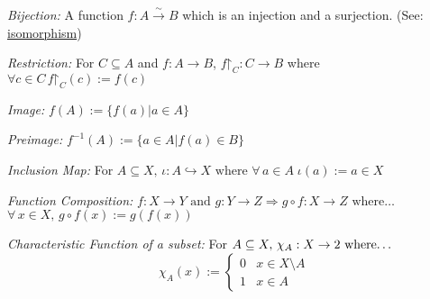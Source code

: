\noindent \emph{Bijection:} \label{bijection} A function $f: A \xrightarrow{\sim} B$ which is an injection and a surjection. (See: \hyperref[isomorphism]{isomorphism}) \newline

\noindent \emph{Restriction:} \label{restriction} For $C \subseteq A$ and $f:A \rightarrow B$, $\ensuremath{f\mathord{\upharpoonright}_C:C \rightarrow B}$ where \mbox{$\forall c \in C \, \ensuremath{f\mathord{\upharpoonright}_C(c)} := f(c)$} \newline

\noindent \emph{Image:} \label{image} $f(A) := \{f(a) | a \in A \}$ \newline

\noindent \emph{Preimage:} \label{preimage} $f^{-1}(A) := \{a \in A | f(a) \in B \}$ \newline

\noindent \emph{Inclusion Map:} \label{inclusionmap} For $A \subseteq X, \, \iota : A \hookrightarrow X \textrm{ where } \forall \, a \in A \; \iota(a) := a \in X$ \newline

\noindent \emph{Function Composition:} \label{functioncomposition} $f:X \rightarrow Y \textrm{ and } g:Y \rightarrow Z \Rightarrow g \circ f:X \rightarrow Z \textrm{ where} \dots$
$\forall \, x \in X, \, g \circ f(x) := g(f(x))$ \newline

\noindent \emph{Characteristic Function of a subset:} \label{characteristicfucntion} For $A \subseteq X, \, \chi_A : X \rightarrow 2 \textrm{ where\dots}$
\[\chi_A(x) := \begin{cases} 
      0 & x \in X \setminus A \\
      1 & x \in A 
   \end{cases} \] \newline